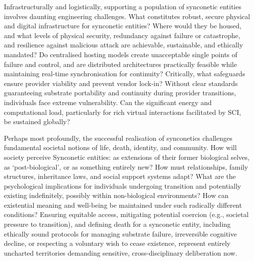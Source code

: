 \documentclass[10pt]{article}
\begin{document}
\begin{sloppypar}
  Infrastructurally and logistically, supporting a population of synconetic entities involves daunting engineering challenges. What constitutes robust, secure physical and digital infrastructure for synconetic entities? Where would they be housed, and what levels of physical security, redundancy against failure or catastrophe, and resilience against malicious attack are achievable, sustainable, and ethically mandated? Do centralised hosting models create unacceptable single points of failure and control, and are distributed architectures practically feasible while maintaining real-time synchronisation for continuity? Critically, what safeguards ensure provider viability and prevent vendor lock-in? Without clear standards guaranteeing substrate portability and continuity during provider transitions, individuals face extreme vulnerability. Can the significant energy and computational load, particularly for rich virtual interactions facilitated by SCI, be sustained globally?

  Perhaps most profoundly, the successful realisation of synconetics challenges fundamental societal notions of life, death, identity, and community. How will society perceive Synconetic entities: as extensions of their former biological selves, as ‘post-biological’, or as something entirely new? How must relationships, family structures, inheritance laws, and social support systems adapt? What are the psychological implications for individuals undergoing transition and potentially existing indefinitely, possibly within non-biological environments? How can existential meaning and well-being be maintained under such radically different conditions? Ensuring equitable access, mitigating potential coercion (e.g., societal pressure to transition), and defining death for a synconetic entity, including ethically sound protocols for managing substrate failure, irreversible cognitive decline, or respecting a voluntary wish to cease existence, represent entirely uncharted territories demanding sensitive, cross-disciplinary deliberation now.



\end{sloppypar}
\end{document}
